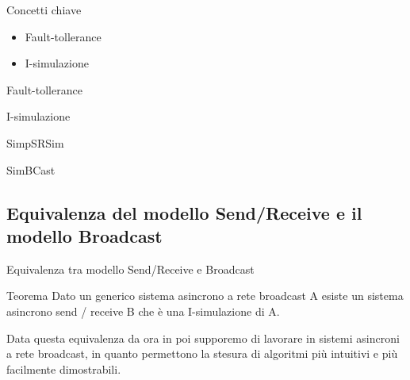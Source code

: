 \documentclass{beamer}
\begin{document}
\begin{frame}{Concetti chiave}
    \begin{itemize}
        \item Fault-tollerance %
        \item I-simulazione
    \end{itemize}    
\end{frame}

\begin{frame}{Fault-tollerance}
    
\end{frame}

\begin{frame}{I-simulazione}
    
\end{frame}

\begin{frame}{SimpSRSim}
    
\end{frame}

\begin{frame}{SimBCast}

\end{frame}


\subsection{Equivalenza del modello Send/Receive e il modello Broadcast}

\begin{frame}{Equivalenza tra modello Send/Receive e Broadcast}
    \begin{block}{Teorema}
        Dato un generico sistema asincrono a rete broadcast A esiste un sistema asincrono send / receive B che è una I-simulazione di A.
    \end{block}
    
    \vspace{0.5cm}
    
    Data questa equivalenza da ora in poi supporemo di lavorare in sistemi asincroni a rete broadcast, in quanto permettono la stesura di algoritmi più intuitivi e più facilmente dimostrabili.
\end{frame}
\end{document}
